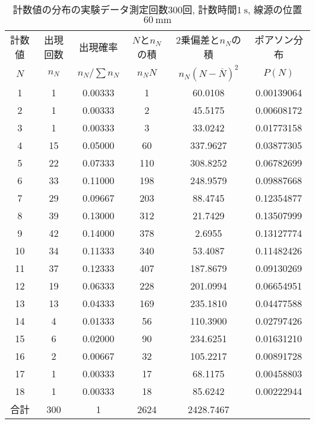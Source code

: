 \documentclass{jarticle}
\begin{document}
\begin{table}[H]
  \caption{計数値の分布の実験データ\protect\linebreak 測定回数$300$回, 計数時間$1\ \mathrm{s}$, 線源の位置$60\ \mathrm{mm}$}
  \label{tb:count-distribution-60mm-300times}
  \hspace{-1cm}
  \begin{tabular}{cccccc}
    \hline
    計数値 & 出現回数 & 出現確率 & $N$と$n_N$の積 & 2乗偏差と$n_N$の積 & ポアソン分布 \\
    $N$ & $n_N$ & $n_N/\sum n_N$ & $n_N N$ & $n_N(N-\overline{N})^2$ & $P(N)$ \\
    \hline
    1 & 1 & 0.00333 & 1 & 60.0108 & 0.00139064 \\
    2 & 1 & 0.00333 & 2 & 45.5175 & 0.00608172 \\
    3 & 1 & 0.00333 & 3 & 33.0242 & 0.01773158 \\
    4 & 15 & 0.05000 & 60 & 337.9627 & 0.03877305 \\
    5 & 22 & 0.07333 & 110 & 308.8252 & 0.06782699 \\
    6 & 33 & 0.11000 & 198 & 248.9579 & 0.09887668 \\
    7 & 29 & 0.09667 & 203 & 88.4745 & 0.12354877 \\
    8 & 39 & 0.13000 & 312 & 21.7429 & 0.13507999 \\
    9 & 42 & 0.14000 & 378 & 2.6955 & 0.13127774 \\
    10 & 34 & 0.11333 & 340 & 53.4087 & 0.11482426 \\
    11 & 37 & 0.12333 & 407 & 187.8679 & 0.09130269 \\
    12 & 19 & 0.06333 & 228 & 201.0994 & 0.06654951 \\
    13 & 13 & 0.04333 & 169 & 235.1810 & 0.04477588 \\
    14 & 4 & 0.01333 & 56 & 110.3900 & 0.02797426 \\
    15 & 6 & 0.02000 & 90 & 234.6251 & 0.01631210 \\
    16 & 2 & 0.00667 & 32 & 105.2217 & 0.00891728 \\
    17 & 1 & 0.00333 & 17 & 68.1175 & 0.00458803 \\
    18 & 1 & 0.00333 & 18 & 85.6242 & 0.00222944 \\
    \hline
    合計 & 300 & 1 & 2624 & 2428.7467 & \\
    \hline
  \end{tabular}
\end{table}

\end{document}
